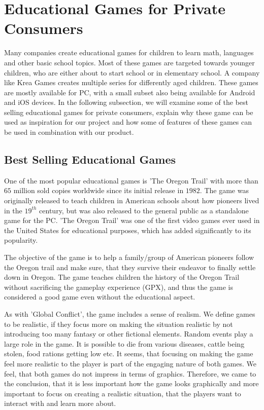 \section{Educational Games for Private Consumers}
\label{sec:privateconsumers}
Many companies create educational games for children to learn math, languages and other basic school topics.
Most of these games are targeted towards younger children, who are either about to start school or in elementary school.
A company like Krea Games creates multiple series for differently aged children.\cite{kreagames}
These games are mostly available for PC, with a small subset also being available for Android and iOS devices.
In the following subsection, we will examine some of the best selling educational games for private consumers, explain why these game can be used as inspiration for our project and how some of features of these games can be used in combination with our product.

\subsection{Best Selling Educational Games}
One of the most popular educational games is 'The Oregon Trail' with more than $65$ million sold copies worldwide since its initial release in $1982$.\cite{oregontrail}
The game was originally released to teach children in American schools about how pioneers lived in the $19^{th}$ century, but was also released to the general public as a standalone game for the PC. 'The Oregon Trail' was one of the first video games ever used in the United States for educational purposes, which has added significantly to its popularity.

The objective of the game is to help a family/group of American pioneers follow the Oregon trail and make sure, that they survive their endeavor to finally settle down in Oregon. The game teaches children the history of the Oregon Trail without sacrificing the gameplay experience (GPX), and thus the game is considered a good game even without the educational aspect.\newline

As with 'Global Conflict', the game includes a sense of realism.
We define games to be realistic, if they focus more on making the situation realistic by not introducing too many fantasy or other fictional elements.
Random events play a large role in the game.
It is possible to die from various diseases, cattle being stolen, food rations getting low etc.
It seems, that focusing on making the game feel more realistic to the player is part of the engaging nature of both games.
We feel, that both games do not impress in terms of graphics.
Therefore, we came to the conclusion, that it is less important how the game looks graphically and more important to focus on creating a realistic situation, that the players want to interact with and learn more about.\newline

